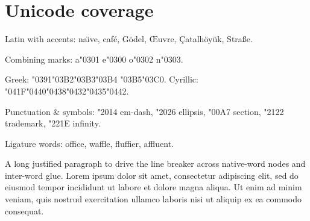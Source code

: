 \documentclass[11pt]{article}
\begin{document}
\section*{Unicode coverage}

Latin with accents: na\"\i ve, café, Gödel, Œuvre, Çatalhöyük, Straße.

Combining marks: a\char"0301{} e\char"0300{} o\char"0302{} n\char"0303.

{\notofont Greek: \char"0391\char"03B2\char"03B3\char"03B4 \char"03B5\char"03C0.
Cyrillic: \char"041F\char"0440\char"0438\char"0432\char"0435\char"0442.}

Punctuation \& symbols: \char"2014 em-dash, \char"2026 ellipsis,
\char"00A7 section, \char"2122 trademark, \char"221E infinity.

Ligature words: office, waffle, fluffier, affluent.

A long justified paragraph to drive the line breaker across native-word
nodes and inter-word glue. Lorem ipsum dolor sit amet, consectetur
adipiscing elit, sed do eiusmod tempor incididunt ut labore et dolore
magna aliqua. Ut enim ad minim veniam, quis nostrud exercitation
ullamco laboris nisi ut aliquip ex ea commodo consequat.
\end{document}

